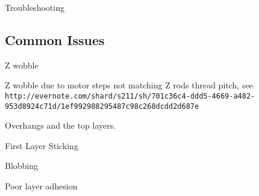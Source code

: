 Troubleshooting

\subsection{Common Issues}

Z wobble

Z wobble due to motor steps not matching Z rods thread pitch, see \texttt{http://evernote.com/shard/s211/sh/701c36c4-ddd5-4669-a482-953d8924c71d/1ef992988295487c98c268dcdd2d687e}

Overhangs and the top layers.

First Layer Sticking

Blobbing

Poor layer adhesion

